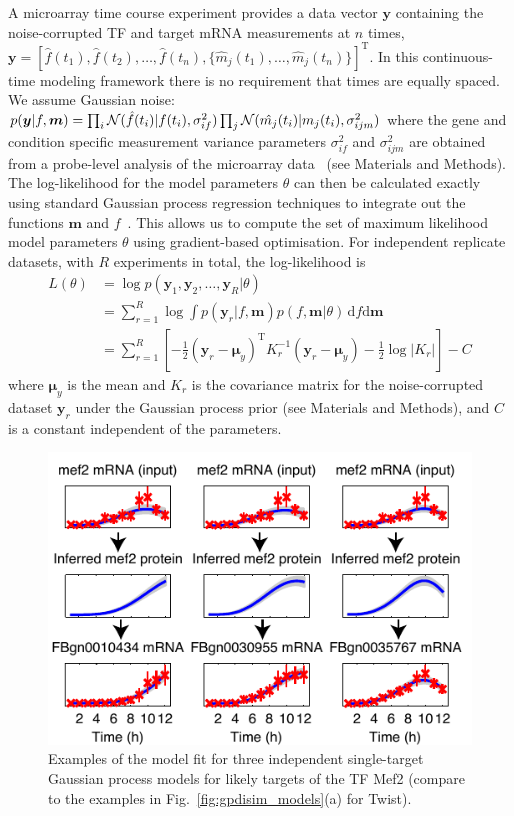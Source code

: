 \documentclass{pnastwo}
\begin{document}
\begin{article}
A microarray time course experiment provides a data vector $\bm y$ containing the noise-corrupted TF and target mRNA
measurements at $n$ times,
$\bm
y=[\hat{f}(t_1),\hat{f}(t_2),\ldots,\hat{f}(t_n),\{\hat{m}_j(t_1),\ldots,\hat{m}_j(t_n)\}]^\mathrm{T}$.
In this continuous-time modeling framework there is no
requirement that times are equally spaced. We assume Gaussian noise:
$p(\bm y|f,\bm m)=\prod_i{\cal
  N}(\hat{f}(t_i)|f(t_i),\sigma_{if}^2)\prod_j{\cal
  N}(\hat{m_j}(t_i)|m_j(t_i),\sigma_{ijm}^2)$ where the gene and condition
specific measurement variance parameters $\sigma_{if}^2$ and
$\sigma_{ijm}^2$ are obtained from a probe-level analysis of the
microarray data~\cite{Liu2005,Pearson2009} (see
Materials and Methods). The log-likelihood for the model parameters
$\theta$ can then be calculated exactly using standard Gaussian process regression
techniques to integrate out the functions $\bm m$ and
$f$~\cite{Rasmussen2006}. 
This allows us to compute the set of maximum likelihood model
parameters $\theta$ using gradient-based optimisation. 
For independent replicate datasets, with
$R$ experiments in total, the
log-likelihood is
\begin{equation*}
  \begin{split}
    L(\theta) & = \log p(\bm y_1,\bm y_2,\ldots,\bm y_{R}|\theta) \\
    & = \sum_{r=1}^{R} \log \!\int 
    \!\!p(\bm y_r|f,\bm m)p(f,\bm m|\theta) \, \mathrm{d}\!f\mathrm{d}\bm m\\
    & = \sum_{r=1}^{R} \left[-\frac{1}{2}(\bm y_r - \bm \mu_y)^\mathrm{T} K_r^{-1} (\bm y_r - \bm \mu_y) -
      \frac{1}{2}\log|K_r|\right] -C      %
  \end{split}
\end{equation*}
where $\bm \mu_y$ is the mean and $K_r$ is the covariance matrix for the
noise-corrupted dataset $\bm y_r$ under the Gaussian process prior (see
Materials and Methods), and $C$ is a constant independent of the
parameters.

\begin{figure}[tb]
  \centering
  \includegraphics{fig2}
  \caption{Examples of the model fit for three independent single-target Gaussian process models for
    likely targets of the TF Mef2 (compare to the examples in Fig.~\ref{fig:gpdisim_models}(a) for Twist).\label{fig:gpdisim_mef2_models} }
\end{figure}


\end{article}
\end{document}
